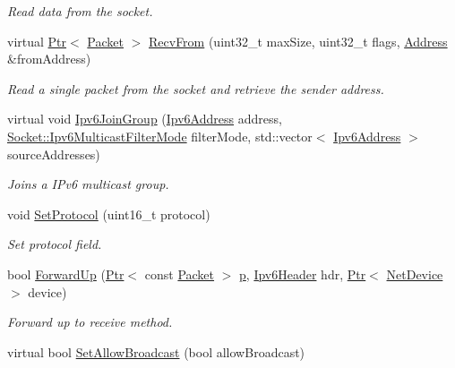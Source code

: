 \begin{DoxyCompactItemize}
\begin{DoxyCompactList}\small\item\em Read data from the socket. \end{DoxyCompactList}\item 
virtual \hyperlink{classns3_1_1Ptr}{Ptr}$<$ \hyperlink{classns3_1_1Packet}{Packet} $>$ \hyperlink{classns3_1_1Ipv6RawSocketImpl_a582900364192f1181e1c904b1a5af6a8}{Recv\+From} (uint32\+\_\+t max\+Size, uint32\+\_\+t flags, \hyperlink{classns3_1_1Address}{Address} \&from\+Address)
\begin{DoxyCompactList}\small\item\em Read a single packet from the socket and retrieve the sender address. \end{DoxyCompactList}\item 
virtual void \hyperlink{classns3_1_1Ipv6RawSocketImpl_a8cb33ebfedf6ce3baaff6048fd41576c}{Ipv6\+Join\+Group} (\hyperlink{classns3_1_1Ipv6Address}{Ipv6\+Address} address, \hyperlink{classns3_1_1Socket_a96f39fe2b73d5691b319093a1e31615d}{Socket\+::\+Ipv6\+Multicast\+Filter\+Mode} filter\+Mode, std\+::vector$<$ \hyperlink{classns3_1_1Ipv6Address}{Ipv6\+Address} $>$ source\+Addresses)
\begin{DoxyCompactList}\small\item\em Joins a I\+Pv6 multicast group. \end{DoxyCompactList}\item 
void \hyperlink{classns3_1_1Ipv6RawSocketImpl_a063d026e3e6e82a05de4e49c06f41129}{Set\+Protocol} (uint16\+\_\+t protocol)
\begin{DoxyCompactList}\small\item\em Set protocol field. \end{DoxyCompactList}\item 
bool \hyperlink{classns3_1_1Ipv6RawSocketImpl_a9b9d0def6375d0a3fbcaa552ebc3e03d}{Forward\+Up} (\hyperlink{classns3_1_1Ptr}{Ptr}$<$ const \hyperlink{classns3_1_1Packet}{Packet} $>$ \hyperlink{lte__link__budget__x2__handover__measures_8m_ac9de518908a968428863f829398a4e62}{p}, \hyperlink{classns3_1_1Ipv6Header}{Ipv6\+Header} hdr, \hyperlink{classns3_1_1Ptr}{Ptr}$<$ \hyperlink{classns3_1_1NetDevice}{Net\+Device} $>$ device)
\begin{DoxyCompactList}\small\item\em Forward up to receive method. \end{DoxyCompactList}\item 
virtual bool \hyperlink{classns3_1_1Ipv6RawSocketImpl_a651705d6a9cbba054335a04c6c2eeb4c}{Set\+Allow\+Broadcast} (bool allow\+Broadcast)

\end{DoxyCompactItemize}
